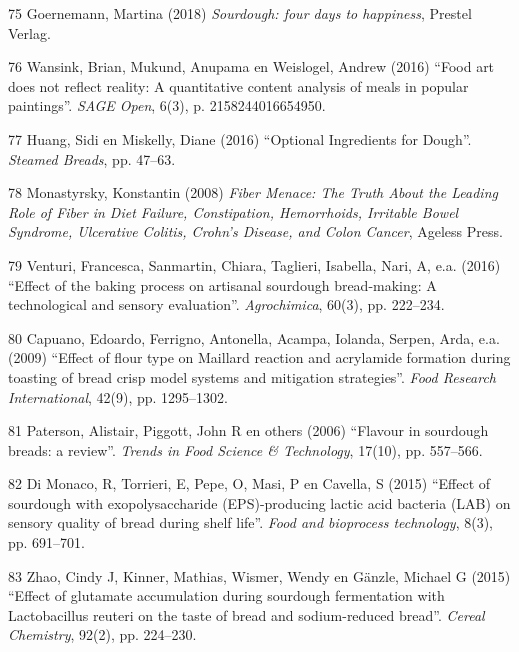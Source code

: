 \documentclass[
  11pt,
  dutch,
]{memoir}
\newlength{\cslhangindent}
\newenvironment{cslreferences}%
  {\setlength{\parindent}{0pt}%
  \everypar{\setlength{\hangindent}{\cslhangindent}}\ignorespaces}%
  {\par}
\begin{document}
\begin{cslreferences}
\leavevmode\hypertarget{ref-goernemannsourdough}{}%
75 Goernemann, Martina (2018) \emph{Sourdough: four days to happiness},
Prestel Verlag.

\leavevmode\hypertarget{ref-wansink2016food}{}%
76 Wansink, Brian, Mukund, Anupama en Weislogel, Andrew (2016) ``Food
art does not reflect reality: A quantitative content analysis of meals
in popular paintings''. \emph{SAGE Open}, 6(3), p. 2158244016654950.

\leavevmode\hypertarget{ref-optionalsoy}{}%
77 Huang, Sidi en Miskelly, Diane (2016) ``Optional Ingredients for
Dough''. \emph{Steamed Breads}, pp. 47--63.

\leavevmode\hypertarget{ref-menace}{}%
78 Monastyrsky, Konstantin (2008) \emph{Fiber Menace: The Truth About
the Leading Role of Fiber in Diet Failure, Constipation, Hemorrhoids,
Irritable Bowel Syndrome, Ulcerative Colitis, Crohn's Disease, and Colon
Cancer}, Ageless Press.

\leavevmode\hypertarget{ref-venturi2016effect}{}%
79 Venturi, Francesca, Sanmartin, Chiara, Taglieri, Isabella, Nari, A,
e.a. (2016) ``Effect of the baking process on artisanal sourdough
bread-making: A technological and sensory evaluation''.
\emph{Agrochimica}, 60(3), pp. 222--234.

\leavevmode\hypertarget{ref-capuano2009effect}{}%
80 Capuano, Edoardo, Ferrigno, Antonella, Acampa, Iolanda, Serpen, Arda,
e.a. (2009) ``Effect of flour type on Maillard reaction and acrylamide
formation during toasting of bread crisp model systems and mitigation
strategies''. \emph{Food Research International}, 42(9), pp. 1295--1302.

\leavevmode\hypertarget{ref-paterson2006flavour}{}%
81 Paterson, Alistair, Piggott, John R en others (2006) ``Flavour in
sourdough breads: a review''. \emph{Trends in Food Science \&
Technology}, 17(10), pp. 557--566.

\leavevmode\hypertarget{ref-di2015effect}{}%
82 Di Monaco, R, Torrieri, E, Pepe, O, Masi, P en Cavella, S (2015)
``Effect of sourdough with exopolysaccharide (EPS)-producing lactic acid
bacteria (LAB) on sensory quality of bread during shelf life''.
\emph{Food and bioprocess technology}, 8(3), pp. 691--701.

\leavevmode\hypertarget{ref-zhao2015effect}{}%
83 Zhao, Cindy J, Kinner, Mathias, Wismer, Wendy en Gänzle, Michael G
(2015) ``Effect of glutamate accumulation during sourdough fermentation
with Lactobacillus reuteri on the taste of bread and sodium-reduced
bread''. \emph{Cereal Chemistry}, 92(2), pp. 224--230.


\end{cslreferences}
\end{document}

